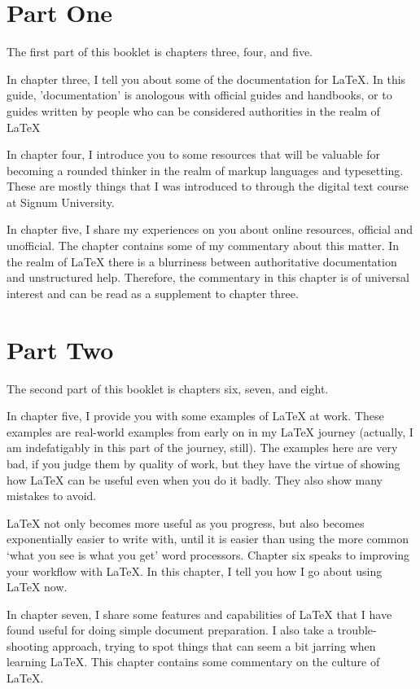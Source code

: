 \documentclass[12pt, oneside]{memoir}
\begin{document}
\section*{Part One}
The first part of this booklet is chapters three, four, and five.

In chapter three, I tell you about some of the documentation for \LaTeX{}. In this guide, 'documentation' is anologous with official guides and handbooks, or to guides written by people who can be considered authorities in the realm of \LaTeX{}

In chapter four, I introduce you to some resources that will be valuable for becoming a rounded thinker in the realm of markup languages and typesetting. These are mostly things that I was introduced to through the digital text course at Signum University.

In chapter five, I share my experiences on you about online resources, official and unofficial. The chapter contains some of my commentary about this matter. In the realm of \LaTeX{} there is a blurriness between authoritative documentation and unstructured help. Therefore, the commentary in this chapter is of universal interest and can be read as a supplement to chapter three.

\section*{Part Two}
The second part of this booklet is chapters six, seven, and eight.

In chapter five, I provide you with some examples of \LaTeX{} at work. These examples are real-world examples from early on in my \LaTeX{} journey (actually, I am indefatigably in this part of the journey, still). The examples here are very bad, if you judge them by quality of work, but they have the virtue of showing how \LaTeX{} can be useful even when you do it badly. They also show many mistakes to avoid.

\LaTeX{} not only becomes more useful as you progress, but also becomes exponentially easier to write with, until it is easier than using the more common `what you see is what you get' word processors. Chapter six speaks to improving your workflow with \LaTeX{}. In this chapter, I tell you how I go about using \LaTeX{} now.

In chapter seven, I share some features and capabilities of \LaTeX{} that I have found useful for doing simple document preparation. I also take a trouble-shooting approach, trying to spot things that can seem a bit jarring when learning \LaTeX{}. This chapter contains some commentary on the culture of \LaTeX{}.
\end{document}
